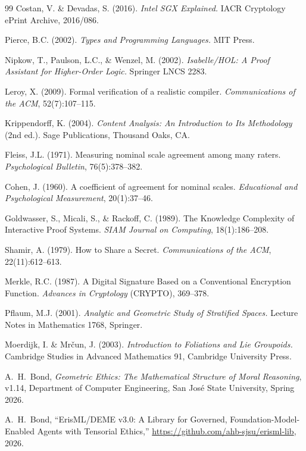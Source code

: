\documentclass[11pt,letterpaper]{article}
\theoremstyle{definition}
\theoremstyle{remark}
\begin{document}
\begin{thebibliography}{99}
Costan, V. \& Devadas, S. (2016). \emph{Intel SGX Explained.} IACR Cryptology ePrint Archive, 2016/086.

Pierce, B.C. (2002). \emph{Types and Programming Languages.} MIT Press.

Nipkow, T., Paulson, L.C., \& Wenzel, M. (2002). \emph{Isabelle/HOL: A Proof Assistant for Higher-Order Logic.} Springer LNCS 2283.

Leroy, X. (2009). Formal verification of a realistic compiler. \emph{Communications of the ACM}, 52(7):107--115.

Krippendorff, K. (2004). \emph{Content Analysis: An Introduction to Its Methodology} (2nd ed.). Sage Publications, Thousand Oaks, CA.

Fleiss, J.L. (1971). Measuring nominal scale agreement among many raters. \emph{Psychological Bulletin}, 76(5):378--382.

Cohen, J. (1960). A coefficient of agreement for nominal scales. \emph{Educational and Psychological Measurement}, 20(1):37--46.

Goldwasser, S., Micali, S., \& Rackoff, C. (1989). The Knowledge Complexity of Interactive Proof Systems. \emph{SIAM Journal on Computing}, 18(1):186--208.

Shamir, A. (1979). How to Share a Secret. \emph{Communications of the ACM}, 22(11):612--613.

Merkle, R.C. (1987). A Digital Signature Based on a Conventional Encryption Function. \emph{Advances in Cryptology} (CRYPTO), 369--378.

Pflaum, M.J. (2001). \emph{Analytic and Geometric Study of Stratified Spaces.} Lecture Notes in Mathematics 1768, Springer.

Moerdijk, I. \& Mr\v{c}un, J. (2003). \emph{Introduction to Foliations and Lie Groupoids.} Cambridge Studies in Advanced Mathematics 91, Cambridge University Press.

A.~H.~Bond, \emph{Geometric Ethics: The Mathematical Structure of Moral Reasoning}, v1.14, Department of Computer Engineering, San Jos\'e State University, Spring 2026.

A.~H.~Bond, ``ErisML/DEME v3.0: A Library for Governed, Foundation-Model-Enabled Agents with Tensorial Ethics,'' \url{https://github.com/ahb-sjsu/erisml-lib}, 2026.

\end{thebibliography}
\end{document}

